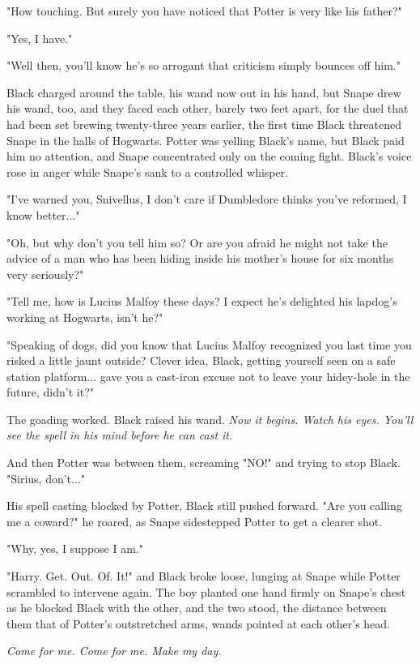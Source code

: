 \documentclass[a4paper,11pt]{article}
\begin{document}
"How touching. But surely you have noticed that Potter is very like his father?"

"Yes, I have."

"Well then, you'll know he's so arrogant that criticism simply bounces off him."

Black charged around the table, his wand now out in his hand, but Snape drew his wand, too, and they faced each other, barely two feet apart, for the duel that had been set brewing twenty-three years earlier, the first time Black threatened Snape in the halls of Hogwarts. Potter was yelling Black's name, but Black paid him no attention, and Snape concentrated only on the coming fight. Black's voice rose in anger while Snape's sank to a controlled whisper.

"I've warned you, Snivellus, I don't care if Dumbledore thinks you've reformed, I know better..."

"Oh, but why don't you tell him so? Or are you afraid he might not take the advice of a man who has been hiding inside his mother's house for six months very seriously?"

"Tell me, how is Lucius Malfoy these days? I expect he's delighted his lapdog's working at Hogwarts, isn't he?"

"Speaking of dogs, did you know that Lucius Malfoy recognized you last time you risked a little jaunt outside? Clever idea, Black, getting yourself seen on a safe station platform... gave you a cast-iron excuse not to leave your hidey-hole in the future, didn't it?"

The goading worked. Black raised his wand. \emph{Now it begins. Watch his eyes. You'll see the spell in his mind before he can cast it.}

And then Potter was between them, screaming "NO!" and trying to stop Black. "Sirius, don't..."

His spell casting blocked by Potter, Black still pushed forward. "Are you calling me a coward?" he roared, as Snape sidestepped Potter to get a clearer shot.

"Why, yes, I suppose I am."

"Harry. Get. Out. Of. It!" and Black broke loose, lunging at Snape while Potter scrambled to intervene again. The boy planted one hand firmly on Snape's chest as he blocked Black with the other, and the two stood, the distance between them that of Potter's outstretched arms, wands pointed at each other's head.

\emph{Come for me. Come for me. Make my day.}
\end{document}
